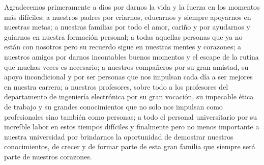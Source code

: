 
\phantom{}
\vfill
\begin{center}
    Agradecemos primeramente a dios por darnos la vida y la  fuerza en los momentos
    más difíciles; a nuestros padres por criarnos, educarnos y siempre apoyarnos en
    nuestras metas; a nuestras familias por todo el amor, cariño y por ayudarnos y
    guiarnos en nuestra formación personal; a todas aquellas personas que ya no
    están con nosotros pero su recuerdo sigue en nuestras mentes y corazones; a
    nuestros amigos por darnos incontables buenos momentos y el escape de la rutina
    que muchas veces es necesario; a nuestros compañeros por su gran amistad, su
    apoyo incondicional y por ser personas que nos impulsan cada día a ser mejores
    en nuestra carrera; a nuestros profesores, sobre todo a los profesores del
    departamento de ingeniería electrónica por su gran vocación, su impecable ética
    de trabajo y su grandes conocimientos que no solo nos impulsan como
    profesionales sino también como  personas; a todo el personal universitario por
    su increíble labor en estos tiempos difíciles y finalmente pero no menos
    importante a nuestra universidad por brindarnos la oportunidad de demostrar
    nuestros conocimientos, de crecer y de formar parte de esta gran familia que
    siempre será parte de nuestros corazones.
\end{center}
\vfill
\phantom{}
